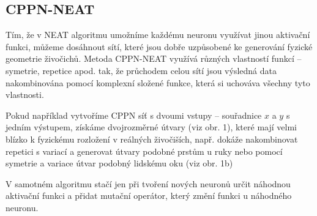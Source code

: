 \documentclass[a4]{article}
\begin{document}
\subsection{CPPN-NEAT}
Tím, že v NEAT algoritmu umožníme každému neuronu využívat jinou aktivační funkci, můžeme dosáhnout sítí, které jsou dobře uzpůsobené ke generování fyzické geometrie živočichů. Metoda CPPN-NEAT\cite{cppn-neat} využívá různých vlastností funkcí -- symetrie, repetice apod. tak, že průchodem celou sítí jsou výsledná data nakombinována pomocí komplexní složené funkce, která si uchováva všechny tyto vlastnosti.\par
Pokud například vytvoříme CPPN síť s dvoumi vstupy -- souřadnice $x$ a $y$ s jedním výstupem, získáme dvojrozměrné útvary (viz obr. 1), které mají velmi blízko k fyzickému rozložení v reálných živočiších, např. dokáže nakombinovat repetici s variací a generovat útvary podobné prstům u ruky nebo pomocí symetrie a variace útvar podobný lidskému oku (viz obr. 1b)\par
V samotném algoritmu stačí jen při tvoření nových neuronů určit náhodnou aktivační funkci a přidat mutační operátor, který změní funkci u náhodného neuronu.\par
\end{document}
